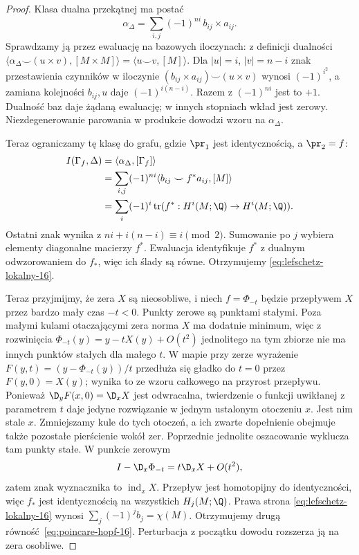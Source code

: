 \begin{proof}
Klasa dualna przekątnej ma postać
\[
 \alpha_\Delta=\sum_{i,j}(-1)^{ni}\,b_{ij}\times a_{ij}.
\]
Sprawdzamy ją przez ewaluację na bazowych iloczynach:
z definicji dualności
$\langle\alpha_\Delta\smile(u\times v),[M\times M]\rangle
=\langle u\smile v,[M]\rangle$.
Dla $|u|=i$, $|v|=n-i$ znak przestawienia czynników
w iloczynie $(b_{ij}\times a_{ij})\smile(u\times v)$
wynosi $(-1)^{i^2}$, a zamiana kolejności $b_{ij},u$
daje $(-1)^{i(n-i)}$. Razem z $(-1)^{ni}$ jest to
$+1$. Dualność baz daje żądaną ewaluację; w innych
stopniach wkład jest zerowy. Niezdegenerowanie
parowania w produkcie dowodzi wzoru na $\alpha_\Delta$.

Teraz ograniczamy tę klasę do grafu, gdzie
$\pr_1$ jest identycznością, a $\pr_2=f$:
\begin{align*}
 I(\Gamma_f,\Delta)
 &=\langle\alpha_\Delta,[\Gamma_f]\rangle\\
 &=\sum_{i,j}(-1)^{ni}
       \langle b_{ij}\smile f^*a_{ij},[M]\rangle\\
 &=\sum_i(-1)^i\operatorname{tr}
       (f^*:H^i(M;\Q)\to H^i(M;\Q)).
\end{align*}
Ostatni znak wynika z
$ni+i(n-i)\equiv i\pmod2$. Sumowanie po $j$
wybiera elementy diagonalne macierzy $f^*$.
Ewaluacja identyfikuje $f^*$ z dualnym odwzorowaniem
do $f_*$, więc ich ślady są równe. Otrzymujemy
\eqref{eq:lefschetz-lokalny-16}.

Teraz przyjmijmy, że
zera $X$ są nieosobliwe,
i niech $f=\Phi_{-t}$
będzie przepływem
$X$ przez bardzo
mały czas $-t<0$.
Punkty zerowe są
punktami stałymi.
Poza małymi kulami
otaczającymi zera
norma $X$ ma
dodatnie minimum,
więc z rozwinięcia
$\Phi_{-t}(y)=y-tX(y)+O(t^2)$
jednolitego na tym
zbiorze nie ma
innych punktów
stałych dla małego $t$.
W mapie przy zerze wyrażenie
$F(y,t)=(y-\Phi_{-t}(y))/t$ przedłuża się gładko
do $t=0$ przez $F(y,0)=X(y)$; wynika to ze wzoru
całkowego na przyrost przepływu. Ponieważ
$\D_yF(x,0)=\D_xX$ jest odwracalna, twierdzenie
o funkcji uwikłanej z parametrem $t$ daje jedyne
rozwiązanie w jednym ustalonym otoczeniu $x$.
Jest nim stale $x$. Zmniejszamy kule do tych
otoczeń, a ich zwarte dopełnienie obejmuje także
pozostałe pierścienie wokół zer. Poprzednie
jednolite oszacowanie wyklucza tam punkty stałe.
W punkcie zerowym
\[
 I-\D_x\Phi_{-t}
   =t\D_xX+O(t^2),
\]
zatem znak wyznacznika
to $\operatorname{ind}_xX$.
Przepływ jest
homotopijny do
identyczności,
więc $f_*$ jest
identycznością
na wszystkich
$H_j(M;\Q)$.
Prawa strona
\eqref{eq:lefschetz-lokalny-16}
wynosi
$\sum_j(-1)^j b_j=\chi(M)$.
Otrzymujemy drugą
równość~\eqref{eq:poincare-hopf-16}.
Perturbacja z początku
dowodu rozszerza ją
na zera osobliwe.
\end{proof}

